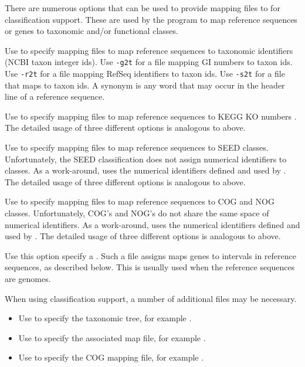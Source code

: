 \documentclass[11pt]{article}
\begin{document}
There are numerous options that can be used to provide mapping files to  for classification support.
These are used
by the program to map reference sequences or genes to taxonomic and/or functional classes.
\begin{itemize}
\setlength{\itemindent}{30pt}
\item[\itt{-g2t} \itt{-r2t} \itt{-s2t}] Use to specify mapping files to map reference sequences to taxonomic identifiers (NCBI taxon integer ids).
Use {\tt -g2t} for a file mapping GI numbers to taxon ids. Use {\tt -r2t} for a file mapping RefSeq identifiers to taxon ids.
Use {\tt -s2t} for a file that maps  to taxon ids. A synonym is any word that may occur in
the header line of a reference sequence.
\item[\itt{-g2k} \itt{-r2k} \itt{-s2k}] Use to specify mapping files to map reference sequences to KEGG KO numbers  \cite{Kanehisa2000} .
The detailed usage of three different options is analogous to above.
\item[\itt{-g2s} \itt{-r2s} \itt{-s2s}] Use to specify mapping files to map reference sequences to SEED \cite{SEED2005} classes.
Unfortunately, the SEED classification does not assign numerical identifiers to classes. As a work-around,
 uses the numerical identifiers defined and used by  \cite{MEGAN2011}.
The detailed usage of three different options is analogous to above.
\item[\itt{-g2c} \itt{-r2c} \itt{-s2c}] Use to specify mapping files to map reference sequences to COG and NOG \cite{Tatusov1997,eggNOG} classes.
Unfortunately,  COG's and NOG's do not share the same space of numerical identifiers. As a work-around,
 uses the numerical identifiers defined and used by  \cite{MEGAN2011}.
The detailed usage of three different options is analogous to above.
{
\item[\itt{-gif}] Use this option specify a . Such a file assigns maps genes to intervals
in reference sequences, as described below. This is usually used when the reference sequences are genomes.
}
\end{itemize}

When using classification support, a number of additional files may be necessary. 
\begin{itemize}
\setlength{\itemindent}{30pt}
\item[\itt{--taxTree}] Use to specify the taxonomic tree, for example .
\item[\itt{--taxMap} ]Use to specify the associated map file, for example  .
\item[\itt{--cogMappingFile}] Use to specify the COG mapping file, for example .
\end{itemize}
\end{document}
